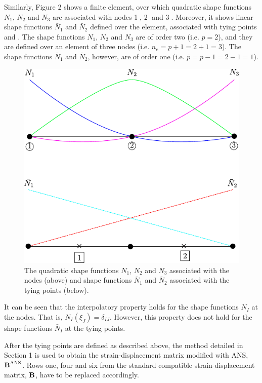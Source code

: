 \documentclass[12pt]{article}
\begin{document}
Similarly, Figure 2 shows a finite element, over which quadratic shape functions $N_1$, $N_2$ and $N_3$ are associated with nodes \textcircled{1}, \textcircled{2} and \textcircled{3}. Moreover, it shows linear shape functions $\bar{N}_1$ and $\bar{N}_2$ defined over the element, associated with tying points  and . The shape functions $N_1$, $N_2$ and $N_3$ are of order two (i.e. $p=2$), and they are defined over an element of three nodes (i.e. $n_e = p+1 = 2+1 = 3$). The shape functions $\bar{N}_1$ and $\bar{N}_2$, however, are of order one (i.e. $\bar{p} = p-1 = 2-1 = 1$).


\begin{figure}[hbt!]
\centering
\includegraphics[scale=1]{quadratic_shape_functions_vs_tying_point}
\caption{The quadratic shape functions $N_1$, $N_2$ and $N_3$ associated with the nodes (above) and shape functions $\bar{N}_1$ and $\bar{N}_2$ associated with the tying points (below).}
\end{figure}

It can be seen that the interpolatory property holds for the shape functions $N_I$ at the nodes. That is, $N_I(\xi_J) = \delta_{IJ}$. However, this property does not hold for the shape functions $\bar{N}_I$ at the tying points. 

After the tying points are defined as described above, the method detailed in Section 1 is used to obtain the strain-displacement matrix modified with ANS, $\text{\bf{B}}^{\text{ANS}}$. Rows one, four and six from the standard compatible strain-displacement matrix, $\text{\bf{B}}$, have to be replaced accordingly.
\end{document}
